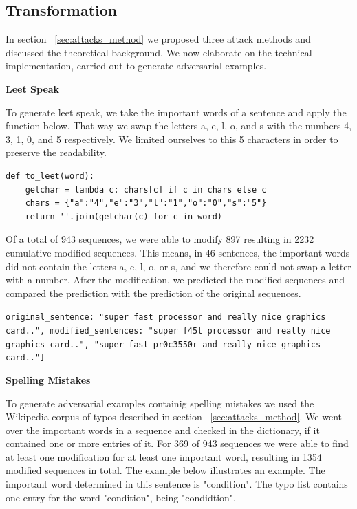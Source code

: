 \subsection{Transformation}
\label{sec:transformation_m}
In section ~\ref{sec:attacks_method} we proposed three attack methods and discussed the theoretical background. We now elaborate on the technical implementation, carried out to generate adversarial examples.

\textbf{Leet Speak}

To generate leet speak, we take the important words of a sentence and apply the function below. That way we swap the letters a, e, l, o, and s with the numbers 4, 3, 1, 0, and 5 respectively. We limited ourselves to this 5 characters in order to preserve the readability. 

\begin{lstlisting}
def to_leet(word):
    getchar = lambda c: chars[c] if c in chars else c
    chars = {"a":"4","e":"3","l":"1","o":"0","s":"5"}
    return ''.join(getchar(c) for c in word)
\end{lstlisting}
Of a total of 943 sequences, we were able to modify 897 resulting in 2232 cumulative modified sequences. This means, in 46 sentences, the important words did not contain the letters a, e, l, o, or s, and we therefore could not swap a letter with a number.
After the modification, we predicted the modified sequences and compared the prediction with the prediction of the original sequences. 

\texttt{original\_sentence: "super fast processor and really nice graphics card..",
modified\_sentences: 
"super f45t processor and really nice graphics card..", 
"super fast pr0c3550r and really nice graphics card.."]}

\textbf{Spelling Mistakes}

To generate adversarial examples containig spelling mistakes we used the Wikipedia corpus of typos described in section ~\ref{sec:attacks_method}. We went over the important words in a sequence and checked in the dictionary, if it contained one or more entries of it. For 369 of 943 sequences we were able to find at least one modification for at least one important word, resulting in 1354  modified sequences in total.
The example below illustrates an example. The important word determined in this sentence is "condition". The typo list contains one entry for the word "condition", being "condidtion". 

